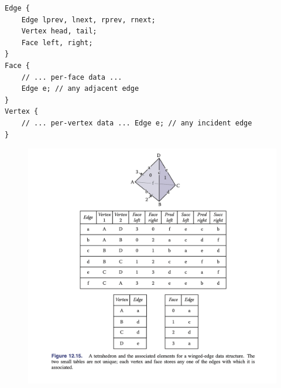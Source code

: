 \documentclass[11pt]{article}
\numberwithin{equation}{section}
\begin{document}
\begin{framed}
\begin{verbatim}
Edge {
	Edge lprev, lnext, rprev, rnext; 
	Vertex head, tail;
	Face left, right;
}
Face {
	// ... per-face data ...
	Edge e; // any adjacent edge
}
Vertex {
	// ... per-vertex data ... Edge e; // any incident edge
}
\end{verbatim}
\end{framed}
\begin{figure}[H]
	\centering
	\includegraphics[scale=0.4]{p22}
\end{figure}
\end{document}
